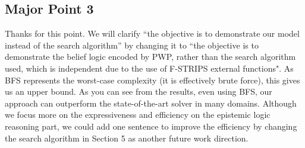 \documentclass[letterpaper]{article} %
\begin{document}
\begin{comment}
Since our contribution is a model for epistemic logic reasoning, it does not have specific requirements on the action encoding. 
To be specific, DEL based approach mainly uses event-based model, which requires the modeller specifying the effects for each type of actions, such as sensing actions, announcing actions. 
How our approach is a state sequence based approach (state based for PWP), which is a model-free approach. 

The modeller can model the problem freely and define the desire epistemic relations (wherever it need to be evaluated, such as precondition or goal) following the grammar we gave in Section 3.1.
Then, they can use our justified perspective function (Section 3.2) to evaluate the semantics (Section 3.3) of those epistemic relations.
And the above Example 1.1 would be a perfect example. The model (perspective functions) and the sequence of states (from initial state to the current expanding search node) would be the input to evaluate the epistemic relation ``$B_i$ j-sct''
\end{comment}

\subsection{Major Point 3}
Thanks for this point. We will clarify ``the objective is to demonstrate our model instead of the search algorithm'' by changing it to ``the objective is to demonstrate the belief logic encoded by PWP, rather than the search algorithm used, which is independent due to the use of F-STRIPS external functions". As BFS represents the worst-case complexity (it is effectively brute force), this gives us an upper bound.
As you can see from the results, even using BFS, our approach can outperform the state-of-the-art solver in many domains.
Although we focus more on the expressiveness and efficiency on the epistemic logic reasoning part, we could add one sentence to improve the efficiency by changing the search algorithm in Section 5 as another future work direction.
\end{document}
